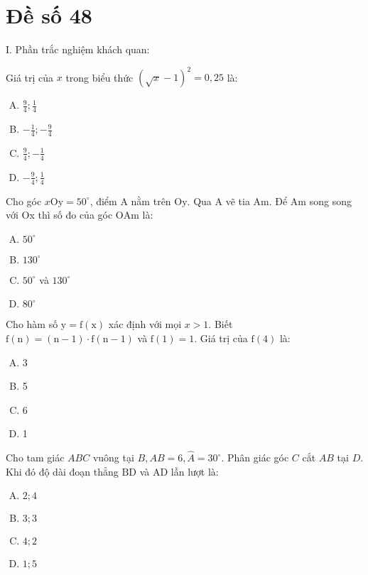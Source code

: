\section{Đề số 48}

I. Phần trắc nghiệm khách quan:
\begin{bt} 
	Giá trị của $x$ trong biểu thức $(\sqrt{x}-1)^2=0,25$ là:
	\begin{enumerate}[A.]
		\item  $\frac{9}{4} ; \frac{1}{4}$
		\item $-\frac{1}{4} ;-\frac{9}{4}$
		\item $\frac{9}{4} ;-\frac{1}{4}$
		\item $-\frac{9}{4} ; \frac{1}{4}$
	\end{enumerate}
\end{bt}

\begin{bt}
	Cho góc $x \mathrm{Oy}=50^{\circ}$, điểm $\mathrm{A}$ nằm trên $\mathrm{Oy}$. Qua $\mathrm{A}$ vẽ tia $\mathrm{Am}$. Để Am song song với Ox thì số đo của góc $\mathrm{OAm}$ là:
	\begin{enumerate}[A.]
		\item $50^{\circ}$
		\item $130^{\circ}$
		\item $50^{\circ}$ và $130^{\circ}$
		\item $80^{\circ}$
	\end{enumerate}
\end{bt}

\begin{bt}
	Cho hàm số $\mathrm{y}=\mathrm{f}(\mathrm{x})$ xác định với mọi $x>1$. Biết $\mathrm{f}(\mathrm{n})=(\mathrm{n}-1) \cdot \mathrm{f}(\mathrm{n}-1)$ và $\mathrm{f}(1)=1$. Giá trị của $\mathrm{f}(4)$ là:
	\begin{enumerate}[A.]
		\item 3
		\item 5
		\item 6
		\item 1
	\end{enumerate}
\end{bt}

\begin{bt}
	Cho tam giác $A B C$ vuông tại $B, A B=6, \hat{A}=30^{\circ}$. Phân giác góc $C$ cắt $A B$ tại $D$. Khi đó độ dài đoạn thẳng $\mathrm{BD}$ và $\mathrm{AD}$ lần lượt là:
	\begin{enumerate}[A.]
		\item $2 ; 4$
		\item $3 ; 3$
		\item $4 ; 2$
		\item $1 ; 5$
	\end{enumerate}
\end{bt}

